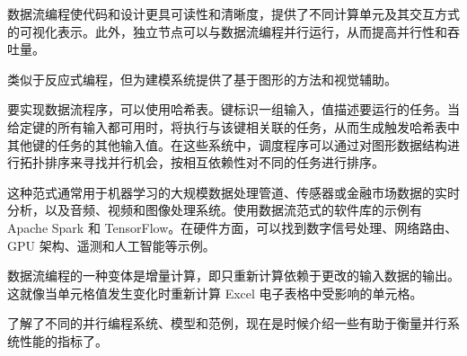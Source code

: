 数据流编程使代码和设计更具可读性和清晰度，提供了不同计算单元及其交互方式的可视化表示。此外，独立节点可以与数据流编程并行运行，从而提高并行性和吞吐量。

类似于反应式编程，但为建模系统提供了基于图形的方法和视觉辅助。

要实现数据流程序，可以使用哈希表。键标识一组输入，值描述要运行的任务。当给定键的所有输入都可用时，将执行与该键相关联的任务，从而生成触发哈希表中其他键的任务的其他输入值。在这些系统中，调度程序可以通过对图形数据结构进行拓扑排序来寻找并行机会，按相互依赖性对不同的任务进行排序。

这种范式通常用于机器学习的大规模数据处理管道、传感器或金融市场数据的实时分析，以及音频、视频和图像处理系统。使用数据流范式的软件库的示例有 Apache Spark 和 TensorFlow。在硬件方面，可以找到数字信号处理、网络路由、 GPU 架构、遥测和人工智能等示例。

数据流编程的一种变体是增量计算，即只重新计算依赖于更改的输入数据的输出。这就像当单元格值发生变化时重新计算 Excel 电子表格中受影响的单元格。

\hspace*{\fill}

了解了不同的并行编程系统、模型和范例，现在是时候介绍一些有助于衡量并行系统性能的指标了。


